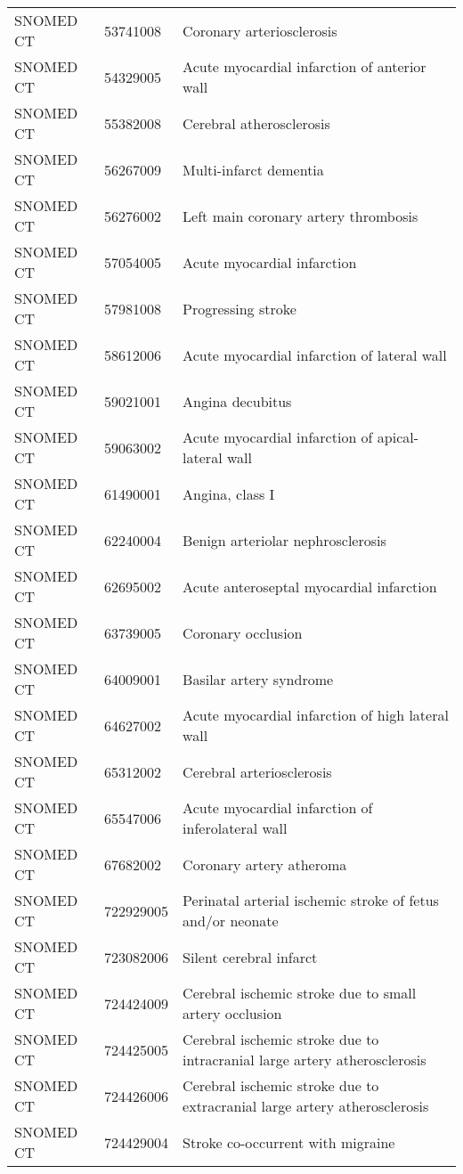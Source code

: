 \begin{longtable}{p{}p{}p{}}
  SNOMED CT & 53741008 & Coronary arteriosclerosis \\ 
  SNOMED CT & 54329005 & Acute myocardial infarction of anterior wall \\ 
  SNOMED CT & 55382008 & Cerebral atherosclerosis \\ 
  SNOMED CT & 56267009 & Multi-infarct dementia \\ 
  SNOMED CT & 56276002 & Left main coronary artery thrombosis \\ 
  SNOMED CT & 57054005 & Acute myocardial infarction \\ 
  SNOMED CT & 57981008 & Progressing stroke \\ 
  SNOMED CT & 58612006 & Acute myocardial infarction of lateral wall \\ 
  SNOMED CT & 59021001 & Angina decubitus \\ 
  SNOMED CT & 59063002 & Acute myocardial infarction of apical-lateral wall \\ 
  SNOMED CT & 61490001 & Angina, class I \\ 
  SNOMED CT & 62240004 & Benign arteriolar nephrosclerosis \\ 
  SNOMED CT & 62695002 & Acute anteroseptal myocardial infarction \\ 
  SNOMED CT & 63739005 & Coronary occlusion \\ 
  SNOMED CT & 64009001 & Basilar artery syndrome \\ 
  SNOMED CT & 64627002 & Acute myocardial infarction of high lateral wall \\ 
  SNOMED CT & 65312002 & Cerebral arteriosclerosis \\ 
  SNOMED CT & 65547006 & Acute myocardial infarction of inferolateral wall \\ 
  SNOMED CT & 67682002 & Coronary artery atheroma \\ 
  SNOMED CT & 722929005 & Perinatal arterial ischemic stroke of fetus and/or neonate \\ 
  SNOMED CT & 723082006 & Silent cerebral infarct \\ 
  SNOMED CT & 724424009 & Cerebral ischemic stroke due to small artery occlusion \\ 
  SNOMED CT & 724425005 & Cerebral ischemic stroke due to intracranial large artery atherosclerosis \\ 
  SNOMED CT & 724426006 & Cerebral ischemic stroke due to extracranial large artery atherosclerosis \\ 
  SNOMED CT & 724429004 & Stroke co-occurrent with migraine \\ 

\end{longtable}
